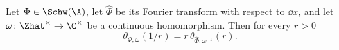 Let $\Phi\in\Schw(\A)$, let $\hat\Phi$ be its Fourier transform with respect to $\dd x$, and let
$\omega\colon\Zhat^\times\to\C^\times$ be a continuous homomorphism. Then for every $r>0$
\[
  \theta_{\Phi,\omega}(1/r)=r\,\theta_{\hat\Phi,\omega^{-1}}(r).
\]
